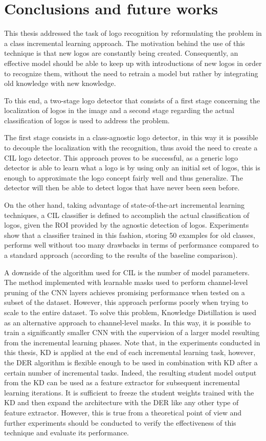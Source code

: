 \chapter{Conclusions and future works}
\label{chap:conclusions}

This thesis addressed the task of logo recognition by reformulating the problem in a class incremental learning approach.
The motivation behind the use of this technique is that new logos are constantly being created.
Consequently, an effective model should be able to keep up with introductions of new logos in order to recognize them, without the need to retrain a model but rather by integrating old knowledge with new knowledge.

To this end, a two-stage logo detector that consists of a first stage concerning the localization of logos in the image and a second stage regarding the actual classification of logos is used to address the problem.

The first stage consists in a class-agnostic logo detector, in this way it is possible to decouple the localization with the recognition, thus avoid the need to create a CIL logo detector. 
This approach proves to be successful, as a generic logo detector is able to learn what a logo is by using only an initial set of logos, this is enough to approximate the logo concept fairly well and thus generalize. The detector will then be able to detect logos that have never been seen before.

On the other hand, taking advantage of state-of-the-art incremental learning techniques, a CIL classifier is defined to accomplish the actual classification of logos, given the ROI provided by the agnostic detection of logos. Experiments show that a classifier trained in this fashion, storing 50 examples for old classes, performs well without too many drawbacks in terms of performance compared to a standard approach (according to the results of the baseline comparison).

A downside of the algorithm used for CIL is the number of model parameters.
The method implemented with learnable masks used to perform channel-level pruning of the CNN layers achieves promising performance when tested on a subset of the dataset. However, this approach performs poorly when trying to scale to the entire dataset. To solve this problem, Knowledge Distillation is used as an alternative approach to channel-level masks. In this way, it is possible to train a significantly smaller CNN with the supervision of a larger model resulting from the incremental learning phases. Note that, in the experiments conducted in this thesis, KD is applied at the end of each incremental learning task, however, the DER algorithm is flexible enough to be used in combination with KD after a certain number of incremental tasks.
Indeed, the resulting student model output from the KD can be used as a feature extractor for subsequent incremental learning iterations. It is sufficient to freeze the student weights trained with the KD and then expand the architecture with the DER like any other type of feature extractor.
However, this is true from a theoretical point of view and further experiments should be conducted to verify the effectiveness of this technique and evaluate its performance.


